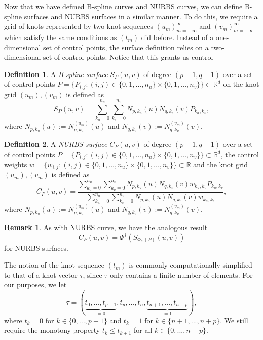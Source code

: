 \documentclass[a4paper, 11pt]{report}
\theoremstyle{definition}
\newtheorem{definition}{Definition}[section]
\newtheorem*{remark}{Remark}
\renewcommand{\emph}[1]{\textit{#1}}
\begin{document}
	Now that we have defined B-spline curves and NURBS curves, we can define B-spline surfaces and NURBS surfaces in a similar manner. To do this, we require a grid of knots represented by two knot sequences $(u_m)_{m=-\infty}^{\infty}$ and $(v_m)_{m=-\infty}^{\infty}$ which satisfy the same conditions as $(t_m)$ did before. Instead of a one-dimensional set of control points, the surface definition relies on a two-dimensional set of control points. Notice that this grants us control 

	\begin{definition}
		A \emph{B-spline surface} $S_P(u,v)$ of degree $(p-1, q-1)$ over a set of control points $P = \{P_{i,j} : (i,j) \in \{0,1,...,n_u\} \times \{0,1,...,n_v\}\} \subset \mathbb{R}^d$ on the knot grid $(u_m), (v_m)$ is defined as
			$$ S_P(u,v) = \sum_{k_u=0}^{n_u} \sum_{k_v=0}^{n_v} N_{p,k_u}(u) N_{q,k_v}(v) P_{k_u,k_v},$$
		where $N_{p,k_u}(u) := N_{p,k_u}^{(u_m)}(u)$ and $N_{q,k_v}(v) := N_{q,k_v}^{(v_m)}(v)$.
	\end{definition}

	\begin{definition}
		A \emph{NURBS surface} $C_P(u,v)$ of degree $(p-1, q-1)$ over a set of control points $P = \{P_{i,j} : (i,j) \in \{0,1,...,n_u\} \times \{0,1,...,n_v\}\} \subset \mathbb{R}^d$, the control weights $w = \{w_{i,j} : (i,j) \in \{0,1,...,n_u\} \times \{0,1,...,n_v\}\} \subset \mathbb{R}$ and the knot grid $(u_m), (v_m)$ is defined as
			$$ C_P(u,v) = \frac {\sum_{k_u=0}^{n_u} \sum_{k_v=0}^{n_v} N_{p,k_u}(u) N_{q,k_v}(v) w_{k_u, k_v} P_{k_u,k_v}}{\sum_{k_u=0}^{n_u} \sum_{k_v=0}^{n_v} N_{p,k_u}(u) N_{q,k_v}(v) w_{k_u, k_v}},$$
		where $N_{p,k_u}(u) := N_{p,k_u}^{(u_m)}(u)$ and $N_{q,k_v}(v) := N_{q,k_v}^{(v_m)}(v)$.
	\end{definition}

	\begin{remark}
		As with NURBS curve, we have the analogous result
			$$ C_P(u,v) = \Phi^\dagger ({S_{\Phi_w(P)}(u,v)}) $$
		for NURBS surfaces.
	\end{remark}

	The notion of the knot sequence $(t_m)$ is commonly computationally simplified to that of a knot vector $\tau$, since $\tau$ only contains a finite number of elements. For our purposes, we let
		$$\tau = (\underbrace {t_0, ..., t_{p-1}}_{= 0}, t_p, ..., t_n, \underbrace{t_{n+1}, ..., t_{n+p}}_{= 1}),$$
	where $t_k = 0$ for $k \in \{0,...,p-1\}$ and $t_k = 1$ for $k \in \{n+1, ..., n+p\}$. We still require the monotony property $t_k \leq t_{k+1}$ for all $k \in \{0, ..., n+p\}$.
\end{document}
